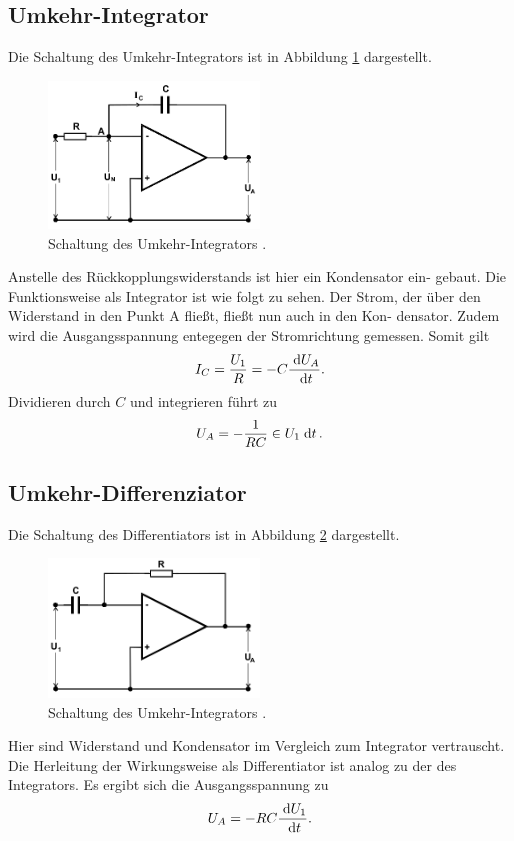 \subsection{Umkehr-Integrator}
Die Schaltung des Umkehr-Integrators ist in
Abbildung \ref{pic:umInt} dargestellt. 
\begin{figure}[t]
 \includegraphics[width = 0.5\textwidth]{../pics/umkehrInt.png}
 \caption{Schaltung des Umkehr-Integrators \cite{Anl}.}
 \label{pic:umInt}
\end{figure}
Anstelle des Rückkopplungswiderstands ist hier ein Kondensator ein-
gebaut. Die Funktionsweise als Integrator ist
wie folgt zu sehen.
Der Strom, der über den Widerstand in den
Punkt A fließt, fließt nun auch in den Kon-
densator. Zudem wird die Ausgangsspannung
entegegen der Stromrichtung gemessen. Somit
gilt
\begin{align}
 I_C = \frac{U_1}{R} = -C \frac{\; \mathrm{d} U_A}{\; \mathrm{d} t}.
\end{align}
Dividieren durch $C$ und integrieren führt zu
\begin{align}
 U_A = -\frac{1}{RC} \in U_1 \; \mathrm{d} t\,.
\end{align}

\subsection{Umkehr-Differenziator}
Die Schaltung des Differentiators ist in Abbildung \ref{pic:umDiff}
dargestellt.
\begin{figure}[t]
 \includegraphics[width = 0.5\textwidth]{../pics/umkehrDiff.png}
 \caption{Schaltung des Umkehr-Integrators \cite{Anl}.}
 \label{pic:umDiff}
\end{figure}
Hier sind Widerstand 
und Kondensator im Vergleich zum
Integrator vertrauscht. Die Herleitung der Wirkungsweise 
als Differentiator ist analog zu der
des Integrators. Es ergibt sich die Ausgangsspannung zu
\begin{align}
 U_A = -RC \frac{\; \mathrm{d} U_1}{\; \mathrm{d} t}.
\end{align}

